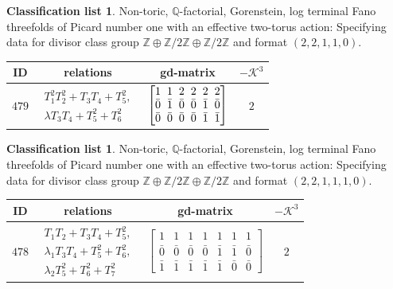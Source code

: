 \documentclass[10pt,a4paper]{amsart}
\theoremstyle{definition}
\newtheorem{class-list}[thm]{Classification list}
\def\ZZ{{\mathbb Z}}
\def\QQ{{\mathbb Q}}
\numberwithin{equation}{section}
\begin{document}
\begin{class-list}
Non-toric, $\QQ$-factorial, Gorenstein, log terminal Fano
threefolds of Picard number one with an effective two-torus action:
Specifying data for divisor class group
$\ZZ\oplus \ZZ/2\ZZ\oplus \ZZ/2\ZZ$ and format $(2,2,1,1,0)$.
\begin{table}[h!]\centering\setlength{\tabcolsep}{5.5pt}
\renewcommand{\arraystretch}{1.15}\small\tabulinesep=1mm
\begin{tabu}{c|c|c|c}
\hline
ID&relations&gd-matrix&$-\mathcal{K}^3$
\\
\hline
${479}$&$\begin{array}{r}{T_{1}^{2}T_{2}^{2}+T_{3}T_{4}+T_{5}^{2}},\\ {\lambda T_{3}T_{4}+T_{5}^{2}+T_{6}^{2}}\end{array}$
&
$\arraycolsep=1mm\begin{bmatrix}{1} & {1} & {2} & {2} & {2} & {2} \\ {\bar{0}} & {\bar{1}} & {\bar{0}} & {\bar{0}} & {\bar{1}} & {\bar{0}} \\ {\bar{0}} & {\bar{0}} & {\bar{0}} & {\bar{0}} & {\bar{1}} & {\bar{1}}\end{bmatrix}$&${2}$
\\
\hline
\end{tabu}\vspace{-4mm}
\end{table}
\end{class-list}



\begin{class-list}
Non-toric, $\QQ$-factorial, Gorenstein, log terminal Fano
threefolds of Picard number one with an effective two-torus action:
Specifying data for divisor class group
$\ZZ\oplus \ZZ/2\ZZ\oplus \ZZ/2\ZZ$ and format $(2,2,1,1,1,0)$.
\begin{table}[h!]\centering\setlength{\tabcolsep}{5.5pt}
\renewcommand{\arraystretch}{1.25}\small\tabulinesep=1mm
\begin{tabu}{c|c|c|c}
\hline
ID&relations&gd-matrix&$-\mathcal{K}^3$
\\
\hline
${478}$&
$\begin{array}{r}{T_{1}T_{2}+T_{3}T_{4}+T_{5}^{2}},\\ {\lambda_{1} T_{3}T_{4}+T_{5}^{2}+T_{6}^{2}},\\ {\lambda_{2} T_{5}^{2}+T_{6}^{2}+T_{7}^{2}}\end{array}$
&$\begin{bmatrix}{1} & {1} & {1} & {1} & {1} & {1} & {1} \\ {\bar{0}} & {\bar{0}} & {\bar{0}} & {\bar{0}} & {\bar{1}} & {\bar{1}} & {\bar{0}} \\ {\bar{1}} & {\bar{1}} & {\bar{1}} & {\bar{1}} & {\bar{1}} & {\bar{0}} & {\bar{0}}\end{bmatrix}$&${2}$
\\
\hline
\end{tabu}%
\end{table}
\end{class-list}
\end{document}
